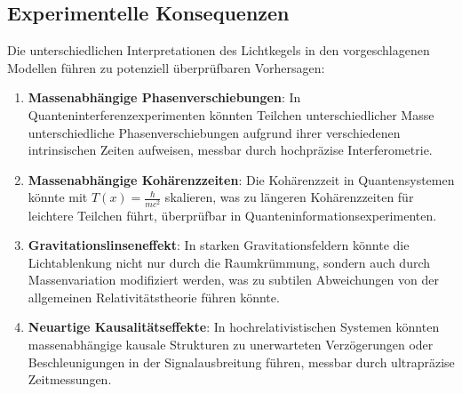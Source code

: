 \documentclass[a4paper,12pt]{article}
\newcommand{\Tfield}{T(x)}
\begin{document}
	\subsection{Experimentelle Konsequenzen}
	Die unterschiedlichen Interpretationen des Lichtkegels in den vorgeschlagenen Modellen führen zu potenziell überprüfbaren Vorhersagen:
	\begin{enumerate}
		\item \textbf{Massenabhängige Phasenverschiebungen}: In Quanteninterferenzexperimenten könnten Teilchen unterschiedlicher Masse unterschiedliche Phasenverschiebungen aufgrund ihrer verschiedenen intrinsischen Zeiten aufweisen, messbar durch hochpräzise Interferometrie.
		\item \textbf{Massenabhängige Kohärenzzeiten}: Die Kohärenzzeit in Quantensystemen könnte mit \(\Tfield = \frac{\hbar}{m c^2}\) skalieren, was zu längeren Kohärenzzeiten für leichtere Teilchen führt, überprüfbar in Quanteninformationsexperimenten.
		\item \textbf{Gravitationslinseneffekt}: In starken Gravitationsfeldern könnte die Lichtablenkung nicht nur durch die Raumkrümmung, sondern auch durch Massenvariation modifiziert werden, was zu subtilen Abweichungen von der allgemeinen Relativitätstheorie führen könnte.
		\item \textbf{Neuartige Kausalitätseffekte}: In hochrelativistischen Systemen könnten massenabhängige kausale Strukturen zu unerwarteten Verzögerungen oder Beschleunigungen in der Signalausbreitung führen, messbar durch ultrapräzise Zeitmessungen.
	\end{enumerate}
	
\end{document}
